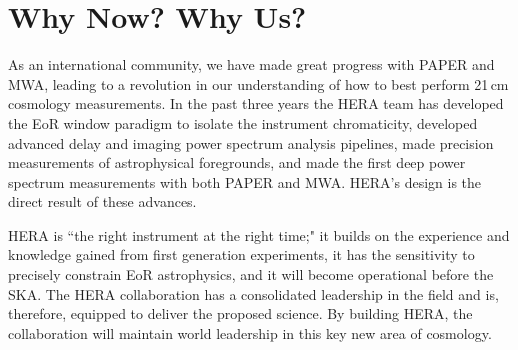 \documentclass[preprint,11pt]{aastex}
\begin{document}
\vspace{-20pt}
\section{Why Now? Why Us?}
\vspace{-5pt}

\noindent As an international community, we have made great progress with PAPER and MWA, leading to a revolution in our understanding of how to best perform 21\,cm cosmology measurements.
In the past three years the HERA team has developed the EoR window paradigm to isolate the instrument chromaticity, developed advanced delay and imaging power spectrum analysis pipelines, made precision measurements of astrophysical foregrounds, and made the first deep power spectrum measurements with both PAPER and MWA. HERA's design is the direct result of these advances.


HERA is ``the right instrument at the right time;" it builds on the experience and knowledge gained from first generation experiments, it has the sensitivity to precisely constrain EoR astrophysics, and it will become operational before the SKA. The HERA collaboration has a consolidated leadership in the field and is, therefore, equipped to deliver the proposed science. By building HERA, the collaboration will maintain world leadership in this key new area of cosmology.

\end{document}
